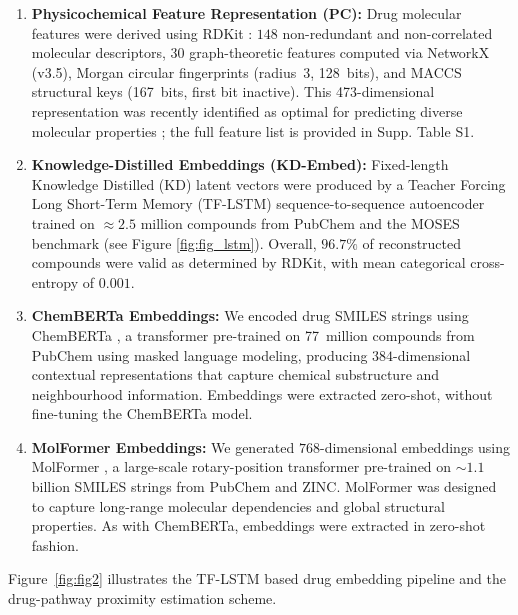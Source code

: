 \documentclass[pdflatex,sn-mathphys-num]{sn-jnl}
\theoremstyle{thmstyleone}
\theoremstyle{thmstyletwo}
\theoremstyle{thmstylethree}
\begin{document}
\begin{enumerate}
    \item \textbf{Physicochemical Feature Representation (PC):} Drug molecular features were derived using RDKit \cite{bento2020open}: $148$ non-redundant and non-correlated molecular descriptors, $30$ graph-theoretic features computed via NetworkX (v3.5), Morgan circular fingerprints (radius~3, 128~bits), and MACCS structural keys (167~bits, first bit inactive). This 473-dimensional representation was recently identified as optimal for predicting diverse molecular properties \cite{harod2025effichem}; the full feature list is provided in Supp. Table S1.

    \item \textbf{Knowledge-Distilled Embeddings (KD-Embed):} Fixed-length Knowledge Distilled (KD) latent vectors were produced by a Teacher Forcing Long Short-Term Memory (TF-LSTM) sequence-to-sequence autoencoder \cite{mall2021modeling} trained on $\approx\!2.5$ million compounds from PubChem \cite{kim2025pubchem} and the MOSES benchmark \cite{10.3389/fphar.2020.565644} (see Figure \ref{fig:fig_lstm}). Overall, $96.7\%$ of reconstructed compounds were valid as determined by RDKit, with mean categorical cross-entropy of $0.001$.
    
    \item \textbf{ChemBERTa Embeddings:} We encoded drug SMILES strings using ChemBERTa \cite{chithrananda2020chemberta}, a transformer pre-trained on 77~million compounds from PubChem using masked language modeling, producing $384$-dimensional contextual representations that capture chemical substructure and neighbourhood information. Embeddings were extracted zero-shot, without fine-tuning the ChemBERTa model.
    \item \textbf{MolFormer Embeddings:} We generated $768$-dimensional embeddings using MolFormer \cite{ross2022large}, a large-scale rotary-position transformer pre-trained on $\sim\!1.1$ billion SMILES strings from PubChem and ZINC. MolFormer was designed to capture long-range molecular dependencies and global structural properties. As with ChemBERTa, embeddings were extracted in zero-shot fashion.
\end{enumerate}

Figure~\ref{fig:fig2} illustrates the TF-LSTM based drug embedding pipeline and the drug-pathway proximity estimation scheme.
\end{document}
